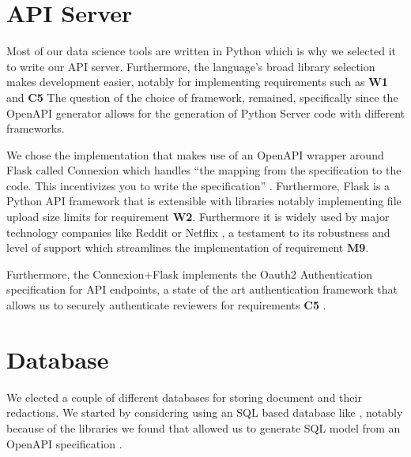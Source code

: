 \documentclass[\version]{l4proj}
\begin{document}
\section{API Server}

Most of our data science tools are written in Python which is why we selected it to write our API server.
Furthermore, the language's broad library selection makes development easier, notably for implementing requirements such as \textbf{W1} and \textbf{C5}
The question of the choice of framework, remained, specifically since the OpenAPI generator allows for the generation of Python Server code with different frameworks.

We chose the implementation that makes use of an OpenAPI wrapper around Flask called Connexion which handles ``the mapping from the specification to the code.
This incentivizes you to write the specification'' \autocite{ZalandoConnexion2020}.
Furthermore, Flask is a Python API framework that is extensible with libraries notably implementing file upload size limits for requirement \textbf{W2}. Furthermore it is widely used by major technology companies like Reddit or Netflix \autocite{WhyDevelopersFlask}, a testament to its robustness and level of support which streamlines the implementation of requirement \textbf{M9}.

Furthermore, the Connexion+Flask implements the Oauth2 Authentication specification for API endpoints, a state of the art authentication framework that allows us to securely authenticate reviewers for requirements \textbf{C5} \autocite{jonesOAuthAuthorizationFramework2012}.

\section{Database}

We elected a couple of different databases for storing document and their redactions.
We started by considering using an SQL based database like \textcite{Postgres2020}, notably because of the libraries we found that allowed us to generate SQL model from an OpenAPI specification \autocite{jdkanderssonJdkanderssonOpenAlchemy2020}.
\end{document}
